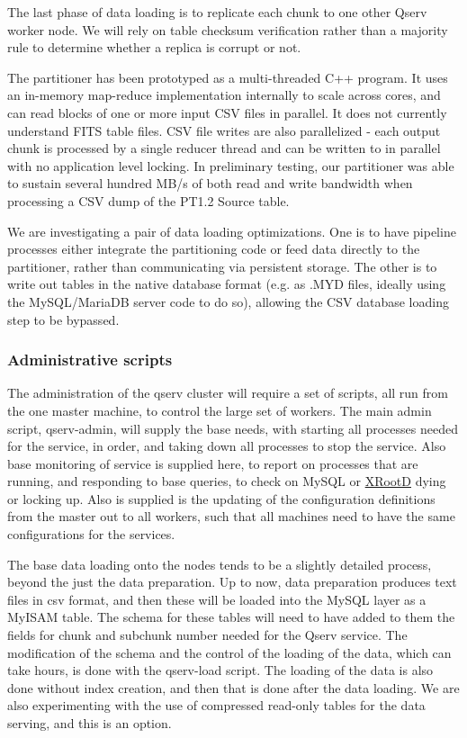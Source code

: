 \documentclass[DM,lsstdraft,toc]{lsstdoc}
\begin{document}
The last phase of data loading is to replicate each chunk to one other
Qserv worker node. We will rely on table checksum verification rather
than a majority rule to determine whether a replica is corrupt or not.

The partitioner has been prototyped as a multi-threaded C++ program. It
uses an in-memory map-reduce implementation internally to scale across
cores, and can read blocks of one or more input CSV files in parallel.
It does not currently understand FITS table files. CSV file writes are
also parallelized - each output chunk is processed by a single reducer
thread and can be written to in parallel with no application level
locking. In preliminary testing, our partitioner was able to sustain
several hundred MB/s of both read and write bandwidth when processing a
CSV dump of the PT1.2 Source table.

We are investigating a pair of data loading optimizations. One is to
have pipeline processes either integrate the partitioning code or feed
data directly to the partitioner, rather than communicating via
persistent storage. The other is to write out tables in the native
database format (e.g. as .MYD files, ideally using the MySQL/MariaDB
server code to do so), allowing the CSV database loading step to be
bypassed.

\subsubsection{Administrative scripts}\label{administrative-scripts}

The administration of the qserv cluster will require a set of scripts,
all run from the one master machine, to control the large set of
workers. The main admin script, qserv-admin, will supply the base needs,
with starting all processes needed for the service, in order, and taking
down all processes to stop the service. Also base monitoring of service
is supplied here, to report on processes that are running, and
responding to base queries, to check on MySQL or
\href{http://xrootd.org}{XRootD} dying or locking up. Also is supplied
is the updating of the configuration definitions from the master out to
all workers, such that all machines need to have the same configurations
for the services.

The base data loading onto the nodes tends to be a slightly detailed
process, beyond the just the data preparation. Up to now, data
preparation produces text files in csv format, and then these will be
loaded into the MySQL layer as a MyISAM table. The schema for these
tables will need to have added to them the fields for chunk and subchunk
number needed for the Qserv service. The modification of the schema and
the control of the loading of the data, which can take hours, is done
with the qserv-load script. The loading of the data is also done without
index creation, and then that is done after the data loading. We are
also experimenting with the use of compressed read-only tables for the
data serving, and this is an option.
\end{document}
